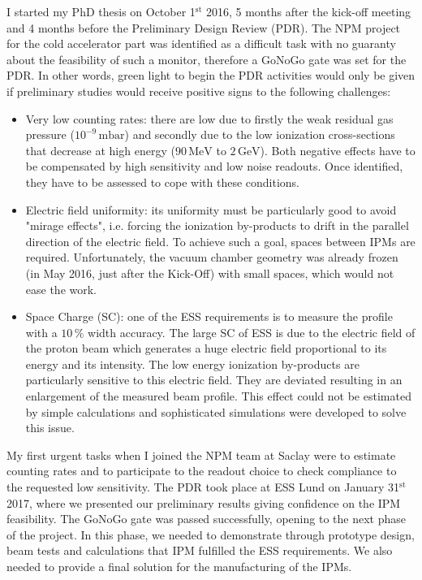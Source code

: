 I started my PhD thesis on October 1$\mathrm{^{st}}$ 2016, 5 months after the kick-off meeting and 4 months before the Preliminary Design Review (PDR). The NPM project for the cold accelerator part was identified as a difficult task with no guaranty about the feasibility of such a monitor, therefore a GoNoGo gate was set for the PDR. In other words, green light to begin the PDR activities would only be given if preliminary studies would receive positive signs to the following challenges:
\begin{itemize}
  \item Very low counting rates: there are low due to firstly the weak residual gas pressure ($10^{-9}\,\mathrm{mbar}$) and secondly due to the low ionization cross-sections that decrease at high energy ($90\,\mathrm{MeV}$ to $2\,\mathrm{GeV}$). Both negative effects have to be compensated by high sensitivity and low noise readouts. Once identified, they have to be assessed to cope with these conditions.
  \item Electric field uniformity: its uniformity must be particularly good to avoid "mirage effects", i.e. forcing the ionization by-products to drift in the parallel direction of the electric field. To achieve such a goal, spaces between IPMs are required. Unfortunately, the vacuum chamber geometry was already frozen (in May 2016, just after the Kick-Off) with small spaces, which would not ease the work.
  \item Space Charge (SC): one of the ESS requirements is to measure the profile with a $10\,\%$ width accuracy. The large SC of ESS is due to the electric field of the proton beam which generates a huge electric field proportional to its energy and its intensity. The low energy ionization by-products are particularly sensitive to this electric field. They are deviated resulting in an enlargement of the measured beam profile. This effect could not be estimated by simple calculations and sophisticated simulations were developed to solve this issue.
\end{itemize}

My first urgent tasks when I joined the NPM team at Saclay were to estimate counting rates and to participate to the readout choice to check compliance to the requested low sensitivity. The PDR took place at ESS Lund on January 31$\mathrm{^{st}}$ 2017, where we presented our preliminary results giving confidence on the IPM feasibility. The GoNoGo gate was passed successfully, opening to the next phase of the project. In this phase, we needed to demonstrate through prototype design, beam tests and calculations that IPM fulfilled the ESS requirements. We also needed to provide a final solution for the manufacturing of the IPMs.

